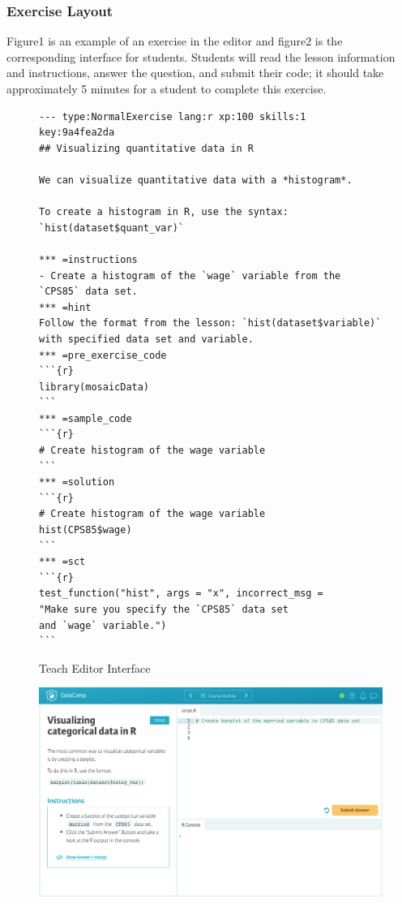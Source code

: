 \documentclass[12pt]{article}\usepackage[]{graphicx}\usepackage[]{color}
\begin{document}
\subsubsection{Exercise Layout}
Figure1 is an example of an exercise in the editor and figure2 is the corresponding interface for students. Students will read the lesson information and instructions, answer the question, and submit their code; it should take approximately 5 minutes for a student to complete this exercise.
\begin{figure}
\caption{Teach Editor Interface}
\begin{Verbatim}[frame=single]
--- type:NormalExercise lang:r xp:100 skills:1 key:9a4fea2da
## Visualizing quantitative data in R

We can visualize quantitative data with a *histogram*.

To create a histogram in R, use the syntax:
`hist(dataset$quant_var)`

*** =instructions
- Create a histogram of the `wage` variable from the 
`CPS85` data set.
*** =hint
Follow the format from the lesson: `hist(dataset$variable)`
with specified data set and variable.
*** =pre_exercise_code
```{r}
library(mosaicData)
```
*** =sample_code
```{r}
# Create histogram of the wage variable
```
*** =solution
```{r}
# Create histogram of the wage variable 
hist(CPS85$wage)
```
*** =sct
```{r}
test_function("hist", args = "x", incorrect_msg = 
"Make sure you specify the `CPS85` data set
and `wage` variable.")
```
\end{Verbatim}
\label{fig:code1}
\end{figure}

\begin{figure}[h]
  \includegraphics[scale = 0.20] {preview.jpg}
\end{figure}
\end{document}
